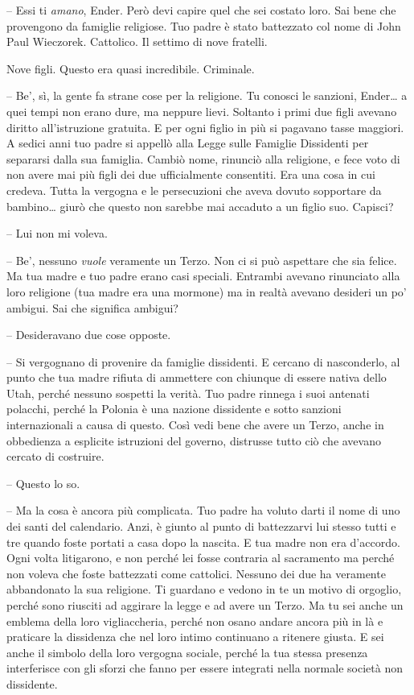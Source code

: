 {-- Essi ti \emph{amano}, \emph{} Ender. Però devi capire quel che sei
	costato loro. Sai bene che provengono da famiglie religiose. Tuo padre è
	stato battezzato col nome di John Paul Wieczorek. Cattolico. Il settimo
	di nove fratelli.}

{Nove figli. Questo era quasi incredibile. Criminale.}

{-- Be', sì, la gente fa strane cose per la religione. Tu conosci le
	sanzioni, Ender\ldots{} a quei tempi non erano dure, ma neppure lievi.
	Soltanto i primi due figli avevano diritto all'istruzione gratuita. E
	per ogni figlio in più si pagavano tasse maggiori. A sedici anni tuo
	padre si appellò alla Legge sulle Famiglie Dissidenti per separarsi
	dalla sua famiglia. Cambiò nome, rinunciò alla religione, e fece voto di
	non avere mai più figli dei due ufficialmente consentiti. Era una cosa
	in cui credeva. Tutta la vergogna e le persecuzioni che aveva dovuto
	sopportare da bambino\ldots{} giurò che questo non sarebbe mai accaduto
	a un figlio suo. Capisci?}

{-- Lui non mi voleva.}

{-- Be', nessuno \emph{vuole} veramente un Terzo. Non ci si può
	aspettare che sia felice. Ma tua madre e tuo padre erano casi speciali.
	Entrambi avevano rinunciato alla loro religione (tua madre era una
	mormone) ma in realtà avevano desideri un po' ambigui. Sai che significa
	ambigui?}

{-- Desideravano due cose opposte.}

{-- Si vergognano di provenire da famiglie dissidenti. E cercano di
	nasconderlo, al punto che tua madre rifiuta di ammettere con chiunque di
	essere nativa dello Utah, perché nessuno sospetti la verità. Tuo padre
	rinnega i suoi antenati polacchi, perché la Polonia è una nazione
	dissidente e sotto sanzioni internazionali a causa di questo. Così vedi
	bene che avere un Terzo, anche in obbedienza a esplicite istruzioni del
	governo, distrusse tutto ciò che avevano cercato di costruire.}

{-- Questo lo so.}

{-- Ma la cosa è ancora più complicata. Tuo padre ha voluto darti il
	nome di uno dei santi del calendario. Anzi, è giunto al punto di
	battezzarvi lui stesso tutti e tre quando foste portati a casa dopo la
	nascita. E tua madre non era d'accordo. Ogni volta litigarono, e non
	perché lei fosse contraria al sacramento ma perché non voleva che foste
	battezzati come cattolici. Nessuno dei due ha veramente abbandonato la
	sua religione. Ti guardano e vedono in te un motivo di orgoglio, perché
	sono riusciti ad aggirare la legge e ad avere un Terzo. Ma tu sei anche
	un emblema della loro vigliaccheria, perché non osano andare ancora più
	in là e praticare la dissidenza che nel loro intimo continuano a
	ritenere giusta. E sei anche il simbolo della loro vergogna sociale,
	perché la tua stessa presenza interferisce con gli sforzi che fanno per
	essere integrati nella normale società non dissidente.}

